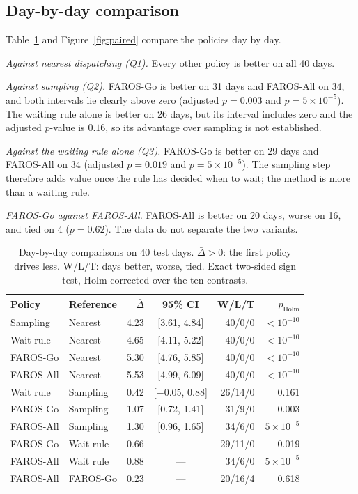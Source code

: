 \documentclass[5p,times,authoryear]{elsarticle}
\begin{document}
\subsection{Day-by-day comparison}

Table~\ref{tab:paired} and Figure~\ref{fig:paired} compare the policies day by day.

\emph{Against nearest dispatching (Q1).} Every other policy is better on all 40 days.

\emph{Against sampling (Q2).} FAROS-Go is better on 31 days and FAROS-All on 34, and both intervals lie clearly above zero (adjusted $p=0.003$ and $p=5\times10^{-5}$). The waiting rule alone is better on 26 days, but its interval includes zero and the adjusted $p$-value is $0.16$, so its advantage over sampling is not established.

\emph{Against the waiting rule alone (Q3).} FAROS-Go is better on 29 days and FAROS-All on 34 (adjusted $p=0.019$ and $p=5\times10^{-5}$). The sampling step therefore adds value once the rule has decided when to wait; the method is more than a waiting rule.

\emph{FAROS-Go against FAROS-All.} FAROS-All is better on 20 days, worse on 16, and tied on 4 ($p=0.62$). The data do not separate the two variants.

\begin{table}[t]
\centering
\footnotesize
\caption{Day-by-day comparisons on 40 test days. $\bar\Delta>0$: the first policy drives less. W/L/T: days better, worse, tied. Exact two-sided sign test, Holm-corrected over the ten contrasts.}
\label{tab:paired}
\setlength{\tabcolsep}{2.5pt}
\begin{tabular}{@{}llrcrr@{}}
\toprule
Policy & Reference & $\bar\Delta$ & 95\% CI & W/L/T & $p_{\mathrm{Holm}}$ \\
\midrule
Sampling & Nearest & 4.23 & [3.61, 4.84] & 40/0/0 & $<10^{-10}$ \\
Wait rule & Nearest & 4.65 & [4.11, 5.22] & 40/0/0 & $<10^{-10}$ \\
FAROS-Go & Nearest & 5.30 & [4.76, 5.85] & 40/0/0 & $<10^{-10}$ \\
FAROS-All & Nearest & 5.53 & [4.99, 6.09] & 40/0/0 & $<10^{-10}$ \\
\midrule
Wait rule & Sampling & 0.42 & [$-$0.05, 0.88] & 26/14/0 & 0.161 \\
FAROS-Go & Sampling & 1.07 & [0.72, 1.41] & 31/9/0 & 0.003 \\
FAROS-All & Sampling & 1.30 & [0.96, 1.65] & 34/6/0 & $5\times10^{-5}$ \\
\midrule
FAROS-Go & Wait rule & 0.66 & --- & 29/11/0 & 0.019 \\
FAROS-All & Wait rule & 0.88 & --- & 34/6/0 & $5\times10^{-5}$ \\
\midrule
FAROS-All & FAROS-Go & 0.23 & --- & 20/16/4 & 0.618 \\
\bottomrule
\end{tabular}
\end{table}
\end{document}
